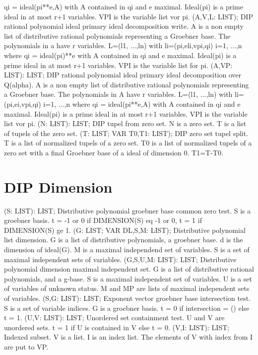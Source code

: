 qi = ideal(pi**e,A) with A contained in qi and e maximal.
Ideal(pi) is a prime ideal in at most r+1 variables. VPI is the 
variable list vor pi.  \ecom 
{} (A,V,L: LIST); \eproc
\bcom DIP rational polynomial ideal primary ideal decomposition write.
A is a non empty list of distributive rational polynomials 
representing a Groebner base. The polynomials in a have r variables.
L=(l1, ...,ln) with li=(pi,eli,vpi,qi) i=1, ...,n where 
qi = ideal(pi)**e with A contained in qi and e maximal.
Ideal(pi) is a prime ideal in at most r+1 variables. VPI is the 
variable list for pi.  \ecom 
{} (A,VP: LIST): LIST; \eproc
\bcom DIP rational polynomial ideal primary ideal decomposition over Q(alpha).
A is a non empty list of distributive rational polynomials 
representing a Groebner base. The polynomials in A have r variables.
L=(l1, ...,ln) with li=(pi,ei,vpi,qi) i=1, ...,n where 
qi = ideal(pi**e,A) with A contained in qi and e maximal.
Ideal(pi) is a prime ideal in at most r+1 variables. VPI is the 
variable list vor pi.  \ecom 
{} (N: LIST): LIST; \eproc
\bcom DIP tupel from zero set. N is a zero set. T is a list of
tupels of the zero set.  \ecom 
{} (T: LIST; VAR T0,T1: LIST); \eproc
\bcom DIP zero set tupel split. T is a list of normalized tupels
of a zero set. T0 is a list of normalized tupels of a zero set 
with a final Groebner base of a ideal of dimension 0. T1=T-T0.  \ecom 
\section{ DIP Dimension  } 
 (S: LIST): LIST; \eproc
\bcom Distributive polynomial groebner base common zero test.
S is a groebner basis. t = -1 or 0 if DIMENSION(S) eq -1 or 0, t = 1
if DIMENSION(S) ge 1.  \ecom 
{} (G: LIST; VAR DL,S,M: LIST); \eproc
\bcom Distributive polynomial list dimension.
G is a list of distributive polynomials, a groebner base.
d is the dimension of ideal(G). M is a maximal independend
set of variables. S is a set of maximal independent sets of
variables.  \ecom 
{} (G,S,U,M: LIST): LIST; \eproc
\bcom Distributive polynomial dimension maximal independent set.
G is a list of distributive rational polynomials, and a g-base.
S is a maximal independent set of variables.
U is a set of variables of unknown status.
M and MP are lists of maximal independent sets of variables.  \ecom 
{} (S,G: LIST): LIST; \eproc
\bcom Exponent vector groebner base intersection test.
S is a set of variable indices. G is a groebner basis.
t = 0 if intersection = () else t = 1.  \ecom 
{} (U,V: LIST): LIST; \eproc
\bcom Unordered set containment test. U and V are unordered sets.
t = 1 if U is contained in V else t = 0.  \ecom 
{} (V,I: LIST): LIST; \eproc
\bcom Indexed subset. V is a list.
I is an index list. The elements of V with index from I
are put to VP.  \ecom 
